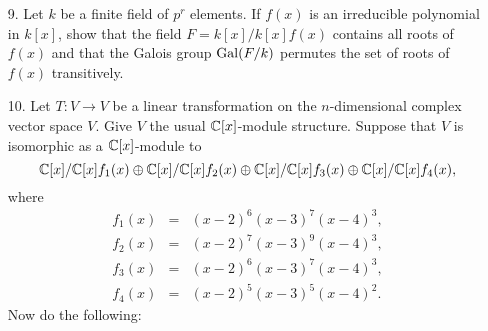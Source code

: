 \documentclass{article}
\begin{document}
\begin{Large}
\begin{itemize}
\item[9.] Let $k$ be a finite field of $p^r$ elements.  If $ f(x)$ is an
irreducible polynomial in $k[x]$, show that the field $F=k[x]/k[x]f(x)$ 
contains all roots of $f(x)$ and that the Galois group $\operatorname{Gal}(F/k)$ permutes
the set of roots of $f(x)$ transitively.

\clearpage

\item[10.] Let $T:V\to V$ be a linear transformation on the $n$-dimensional
complex vector space $V$. Give $V$ the usual $\mathbb C[x]$-module structure.
Suppose that $V$ is isomorphic as a $\mathbb C[x]$-module to 
$$ \mathbb C [x] \slash \mathbb C [x]f_{1}(x) \oplus \mathbb C[x] / \mathbb C [x]f_2(x)
\oplus \mathbb C[x] / \mathbb C [x]f_3(x) \oplus \mathbb C [x] / \mathbb C [x]f_4(x),$$
where
\begin{eqnarray*} f_1(x)&=&(x-2)^6(x-3)^7(x-4)^3, \\ 
f_2(x)&=&(x-2)^7(x-3)^9(x-4)^3,\\
f_3(x)&=&(x-2)^6(x-3)^7(x-4)^3, \\
f_4(x)&=&(x-2)^5(x-3)^5(x-4)^2.
\end{eqnarray*}
Now do the following:

\end{itemize}

    
\end{Large} 
\end{document}
